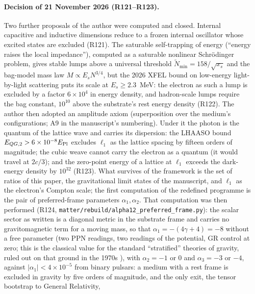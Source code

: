 \documentclass[11pt,a4paper]{article}
\theoremstyle{plain}
\theoremstyle{remark}
\newcommand{\lone}{\ensuremath{\ell_1}}
\begin{document}
\paragraph{Decision of 21 November 2026 (R121--R123).} Two further proposals of the author were computed and
closed. Internal capacitive and inductive dimensions reduce to a frozen internal oscillator whose excited states
are excluded (R121). The saturable self-trapping of energy (``energy raises the local impedance''), computed as a
saturable nonlinear Schr\"odinger problem, gives stable lumps above a universal threshold
$\tilde N_{\min} = 158/\sqrt{x_s}$ and the bag-model mass law $M \propto E_s N^{3/4}$, but the 2026 XFEL bound on
low-energy light-by-light scattering puts its scale at $E_s \geq 2.3$~MeV: the electron as such a lump is excluded
by a factor $6\times10^{4}$ in energy density, and hadron-scale lumps require the bag constant, $10^{10}$ above the
substrate's rest energy density (R122). The author then adopted an amplitude axiom (superposition over the
medium's configurations; A9 in the manuscript's numbering). Under it the photon is the quantum of the lattice
wave and carries its dispersion: the LHAASO bound $E_{QG,2} > 6\times10^{-8}E_{\rm Pl}$ excludes $\lone$ as the
lattice spacing by fifteen orders of magnitude; the cubic weave cannot carry the electron as a quantum (it would
travel at $2c/3$); and the zero-point energy of a lattice at $\lone$ exceeds the dark-energy density by $10^{32}$
(R123). What survives of the framework is the set of ratios of this paper, the gravitational limit states of the
manuscript, and $\lone$ as the electron's Compton scale; the first computation of the redefined programme is the
pair of preferred-frame parameters $\alpha_1, \alpha_2$. That computation was then performed (R124,
\texttt{matter/rebuild/alpha12\_preferred\_frame.py}): the scalar sector as written is a diagonal metric in the
substrate frame and carries no gravitomagnetic term for a moving mass, so that $\alpha_1 = -(4\gamma+4) = -8$ without
a free parameter (two PPN readings, two readings of the potential, GR control at zero; this is the classical value
for the standard ``stratified'' theories of gravity, ruled out on that ground in the 1970s \cite{ni1972,nordtvedtwill1972}), with $\alpha_2 = -1$ or $0$
and $\alpha_3 = -3$ or $-4$, against $|\alpha_1| < 4\times10^{-5}$ from binary pulsars: a medium with a rest frame is
excluded in gravity by five orders of magnitude, and the only exit, the tensor bootstrap to General Relativity,
\end{document}
